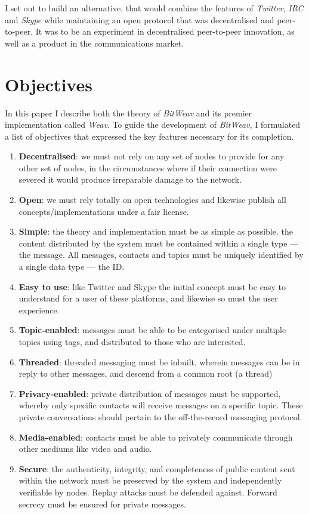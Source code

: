 \documentclass[10pt,a4paper,onecolumn]{article}
\begin{document}
I set out to build an alternative, that would combine the features of \textit{Twitter}, \textit{IRC} and \textit{Skype} while maintaining an open protocol that was decentralised and peer-to-peer. It was to be an experiment in decentralised peer-to-peer innovation, as well as a product in the communications market.

\section{Objectives}
In this paper I describe both the theory of \textit{BitWeav} and its premier implementation called \textit{Weav}. To guide the development of \textit{BitWeav}, I formulated a list of objectives that expressed the key features necessary for its completion.
\begin{enumerate}
\item \textbf{Decentralised}: we must not rely on any set of nodes to provide for any other set of nodes, in the circumstances where if their connection were severed it would produce irreparable damage to the network. 

\item \textbf{Open}: we must rely totally on open technologies and likewise publish all concepts/implementations under a fair license.

\item \textbf{Simple}: the theory and implementation must be as simple as possible. the content distributed by the system must be contained within a single type — the message. All messages, contacts and topics must be uniquely identified by a single data type — the ID.

\item \textbf{Easy to use}: like Twitter and Skype the initial concept must be easy to understand for a user of these platforms, and likewise so must the user experience.

\item \textbf{Topic-enabled}: messages must be able to be categorised under multiple topics using tags, and distributed to those who are interested.

\item \textbf{Threaded}: threaded messaging must be inbuilt, wherein messages can be in reply to other messages, and descend from a common root (a thread)

\item \textbf{Privacy-enabled}: private distribution of messages must be supported, whereby only specific contacts will receive messages on a specific topic. These private conversations should pertain to the off-the-record messaging protocol. 

\item \textbf{Media-enabled}: contacts must be able to privately communicate through other mediums like video and audio. 

\item \textbf{Secure}: the authenticity, integrity, and completeness of public content sent within the network must be preserved by the system and independently verifiable by nodes. Replay attacks must be defended against. Forward secrecy must be ensured for private messages.
\end{enumerate}
\end{document}
